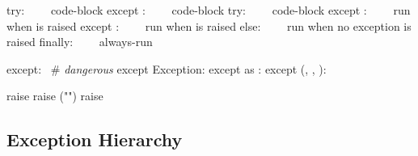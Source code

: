 \documentclass{refcard}
\begin{document}
\begin{ldesc}
		try: \li
		~~~~code-block \li
		except : \li
		~~~~code-block \li
		try: \li
		~~~~code-block \li
		except : \li
		~~~~\textnormal{run when  is raised} \li
		except : \li
		~~~~\textnormal{run when  is raised} \li
		else: \li
		~~~~\textnormal{run when no exception is raised} \li
		finally: \li
		~~~~always-run \li

	   except: ~\# \textnormal{\emph{dangerous}}
	  except Exception:
	\li[catch as]                  except  as :
	 except (, , ): \li
	  

	       raise 
	    raise ("")
	  raise
\end{ldesc}

\subsection{Exception Hierarchy}
\end{document}
